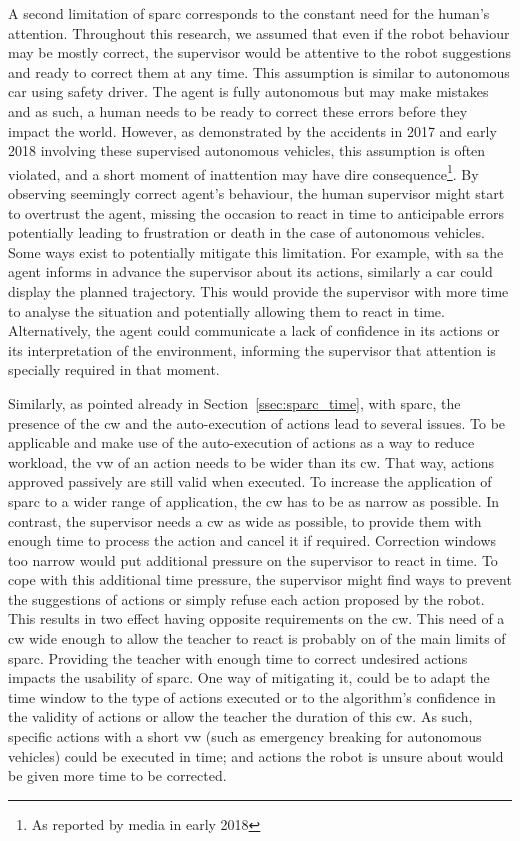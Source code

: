 A second limitation of \gls{sparc} corresponds to the constant need for the human's attention. Throughout this research, we assumed that even if the robot behaviour may be mostly correct, the supervisor would be attentive to the robot suggestions and ready to correct them at any time. This assumption is similar to autonomous car using safety driver. The agent is fully autonomous but may make mistakes and as such, a human needs to be ready to correct these errors before they impact the world. However, as demonstrated by the accidents in 2017 and early 2018 involving these supervised autonomous vehicles, this assumption is often violated, and a short moment of inattention may have dire consequence\footnote{As reported by media in early 2018}. By observing seemingly correct agent's behaviour, the human supervisor might start to overtrust the agent, missing the occasion to react in time to anticipable errors potentially leading to frustration or death in the case of autonomous vehicles. Some ways exist to potentially mitigate this limitation. For example, with \gls{sa} the agent informs in advance the supervisor about its actions, similarly a car could display the planned trajectory. This would provide the supervisor with more time to analyse the situation and potentially allowing them to react in time. Alternatively, the agent could communicate a lack of confidence in its actions or its interpretation of the environment, informing the supervisor that attention is specially required in that moment.

Similarly, as pointed already in Section~\ref{ssec:sparc_time}, with \gls{sparc}, the presence of the \gls{cw} and the auto-execution of actions lead to several issues. To be applicable and make use of the auto-execution of actions as a way to reduce workload, the \gls{vw} of an action needs to be wider than its \gls{cw}. That way, actions approved passively are still valid when executed. To increase the application of \gls{sparc} to a wider range of application, the \gls{cw} has to be as narrow as possible. In contrast, the supervisor needs a \gls{cw} as wide as possible, to provide them with enough time to process the action and cancel it if required. Correction windows too narrow would put additional pressure on the supervisor to react in time. To cope with this additional time pressure, the supervisor might find ways to prevent the suggestions of actions or simply refuse each action proposed by the robot. This results in two effect having opposite requirements on the \gls{cw}. This need of a \gls{cw} wide enough to allow the teacher to react is probably on of the main limits of \gls{sparc}. Providing the teacher with enough time to correct undesired actions impacts the usability of \gls{sparc}. One way of mitigating it, could be to adapt the time window to the type of actions executed or to the algorithm's confidence in the validity of actions or allow the teacher the duration of this \gls{cw}. As such, specific actions with a short \gls{vw} (such as emergency breaking for autonomous vehicles) could be executed in time; and actions the robot is unsure about would be given more time to be corrected. 

